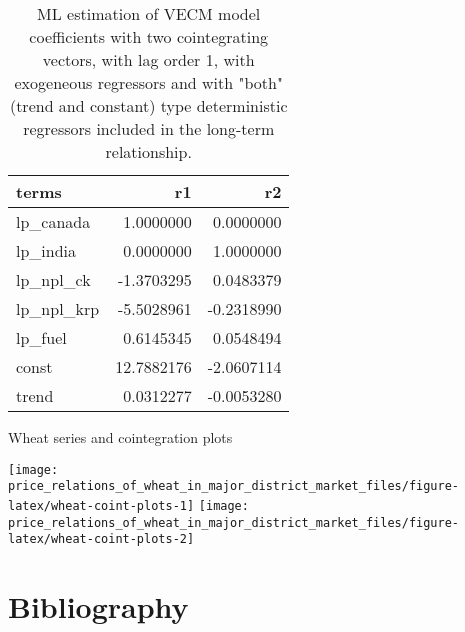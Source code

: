 \documentclass[
  12pt,
]{article}
\begin{document}
\begin{table}

\caption{\label{tab:wheat-cajo-test-withex-summary}ML estimation of VECM model coefficients with two cointegrating vectors, with lag order 1, with exogeneous regressors and with "both" (trend and constant) type deterministic regressors included in the long-term relationship.}
\centering
\begin{tabular}[t]{lrr}
\toprule
terms & r1 & r2\\
\midrule
lp\_canada & 1.0000000 & 0.0000000\\
lp\_india & 0.0000000 & 1.0000000\\
lp\_npl\_ck & -1.3703295 & 0.0483379\\
lp\_npl\_krp & -5.5028961 & -0.2318990\\
lp\_fuel & 0.6145345 & 0.0548494\\
\addlinespace
const & 12.7882176 & -2.0607114\\
trend & 0.0312277 & -0.0053280\\
\bottomrule
\end{tabular}
\end{table}

Wheat series and cointegration plots

\begin{center}\texttt{[image: price\_relations\_of\_wheat\_in\_major\_district\_market\_files/figure-latex/wheat-coint-plots-1]} \texttt{[image: price\_relations\_of\_wheat\_in\_major\_district\_market\_files/figure-latex/wheat-coint-plots-2]} \end{center}

\hypertarget{bibliography}{%
\section*{Bibliography}\label{bibliography}}
\end{document}
